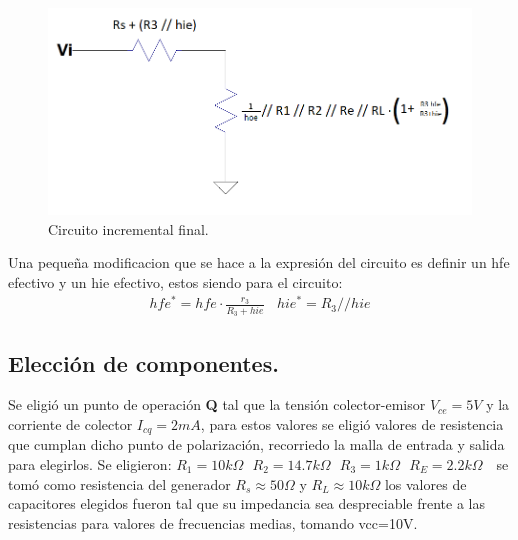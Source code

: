 \documentclass[a4paper]{article}
\begin{document}
\begin{figure} [H]
	\centering
	\includegraphics[width=\textwidth]{imagenes/circinc2.png}
	\caption{Circuito incremental final.}
	\label{fig:circinc2}
\end{figure}
Una pequeña modificacion que se hace a la expresión del circuito es definir un hfe efectivo y un hie efectivo, estos siendo para el circuito:
\begin{align} hfe^* = hfe\cdot \frac{r_3}{R_3+hie} \ \ \ \ hie^* = R_3 // hie \end{align}
\subsection{Elección de componentes.}
Se eligió un punto de operación \textbf{Q} tal que la tensión colector-emisor $V_{ce} = 5 V$ y la corriente de colector $I_{cq} = 2mA$, para estos valores se eligió valores de resistencia que cumplan dicho punto de polarización, recorriedo la malla de entrada y salida para elegirlos. Se eligieron:
$R_1 = 10k\Omega \ \ \ R_2 = 14.7 k\Omega \ \ \ R_3 = 1 k\Omega \ \ \ R_E = 2.2k\Omega \ \ \ $
se tomó como resistencia del generador $R_s \approx 50 \Omega$ y $R_L \approx 10k\Omega $ los valores de capacitores elegidos fueron tal que su impedancia sea despreciable frente a las resistencias para valores de frecuencias medias, tomando vcc=10V.
\end{document}

